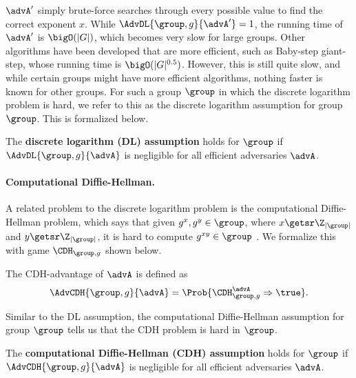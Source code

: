 $\advA'$ simply brute-force searches through every possible value to find the correct exponent $x$. While $\AdvDL{\group, g}{\advA'}=1$, the running time of $\advA'$ is $\bigO(|G|)$, which becomes very slow for large groups. Other algorithms have been developed that are more efficient, such as Baby-step giant-step, whose running time is $\bigO(|G|^{0.5})$. However, this is still quite slow, and while certain groups might have more efficient algorithms, nothing faster is known for other groups. For such a group $\group$ in which the discrete logarithm problem is hard, we refer to this as the discrete logarithm assumption for group $\group$. This is formalized below.

\begin{definition}
	The \textbf{discrete logarithm (DL) assumption} holds for $\group$ if $\AdvDL{\group, g}{\advA}$ is negligible for all efficient adversaries $\advA$.
\end{definition}

\paragraph{Computational Diffie-Hellman.} A related problem to the discrete logarithm problem is the computational Diffie-Hellman problem, which says that given $g^x, g^y \in \group$, where $x \getsr \Z_{|\group|}$ and $y \getsr \Z_{|\group|}$, it is hard to compute $g^{xy} \in \group$ \cite{BonehShoupBook}. We formalize this with game $\CDH_{\group, g}$ shown below.  

\begin{center}
\end{center}

The CDH-advantage of $\advA$ is defined as 
\begin{equation*}
\AdvCDH{\group, g}{\advA} = \Prob{\CDH^\advA_{\group, g}\Rightarrow\true}.
\end{equation*}

Similar to the DL assumption, the computational Diffie-Hellman assumption for group $\group$ tells us that the CDH problem is hard in $\group$.

\begin{definition}
	The \textbf{computational Diffie-Hellman (CDH) assumption} holds for $\group$ if $\AdvCDH{\group, g}{\advA}$ is negligible for all efficient adversaries $\advA$.
\end{definition}

